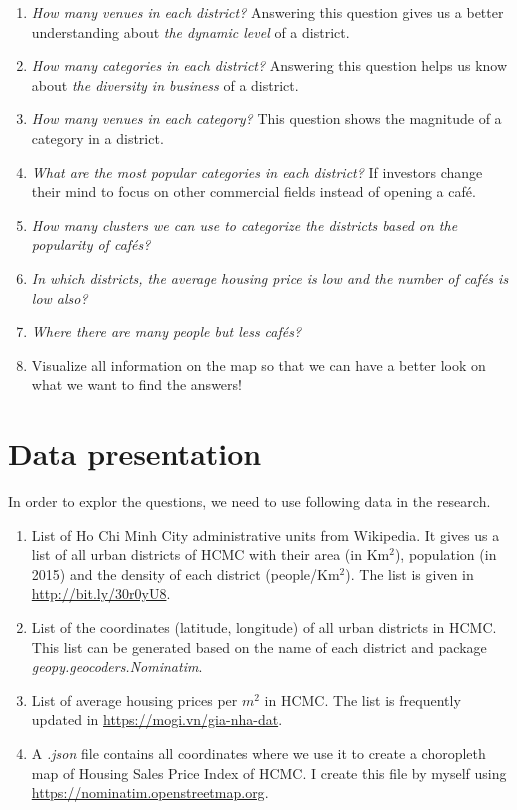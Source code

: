 \documentclass[12pt,a4paper]{article}
\begin{document}
\begin{enumerate}
\item \textit{How many venues in each district?} Answering this question gives us a better understanding about \textit{the dynamic level} of a district.
\item \textit{How many categories in each district?} Answering this question helps us know about \textit{the diversity in business} of a district.
\item \textit{How many venues in each category?} This question shows the magnitude of a category in a district.
\item \textit{What are the most popular categories in each district?} If investors change their mind to focus on other commercial fields instead of opening a café.
\item \textit{How many clusters we can use to categorize the districts based on the popularity of cafés?}
\item \textit{In which districts, the average housing price is low and the number of cafés is low also?}
\item \textit{Where there are many people but less cafés?}
\item Visualize all information on the map so that we can have a better look on what we want to find the answers!
\end{enumerate}

\section{Data presentation}

In order to explor the questions, we need to use following data in the research.

\begin{enumerate}
\item List of Ho Chi Minh City administrative units from Wikipedia. It gives us a list of all urban districts of HCMC with their area (in Km$^2$), population (in 2015) and the density of each district (people/Km$^2$). The list is given in \url{http://bit.ly/30r0yU8}.
\item List of the coordinates (latitude, longitude) of all urban districts in HCMC. This list can be generated based on the name of each district and package \textit{geopy.geocoders.Nominatim}.
\item List of average housing prices per $m^2$ in HCMC. The list is frequently updated in \url{https://mogi.vn/gia-nha-dat}.
\item A \textit{.json} file contains all coordinates where we use it to create a choropleth map of Housing Sales Price Index of HCMC. I create this file by myself using \url{https://nominatim.openstreetmap.org}.
\end{enumerate}
\end{document}
